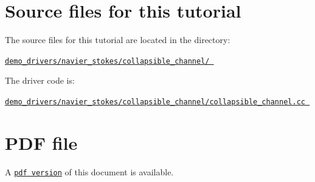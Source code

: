  

\hypertarget{index_sources}{}\section{Source files for this tutorial}\label{index_sources}

\begin{DoxyItemize}
\item The source files for this tutorial are located in the directory\+: \begin{center} \href{../../../../demo_drivers/navier_stokes/collapsible_channel/}{\tt demo\+\_\+drivers/navier\+\_\+stokes/collapsible\+\_\+channel/ } \end{center} 
\item The driver code is\+: \begin{center} \href{../../../../demo_drivers/navier_stokes/collapsible_channel/collapsible_channel.cc}{\tt demo\+\_\+drivers/navier\+\_\+stokes/collapsible\+\_\+channel/collapsible\+\_\+channel.\+cc } \end{center} 
\end{DoxyItemize}

 

 \hypertarget{index_pdf}{}\section{P\+D\+F file}\label{index_pdf}
A \href{../latex/refman.pdf}{\tt pdf version} of this document is available. 
